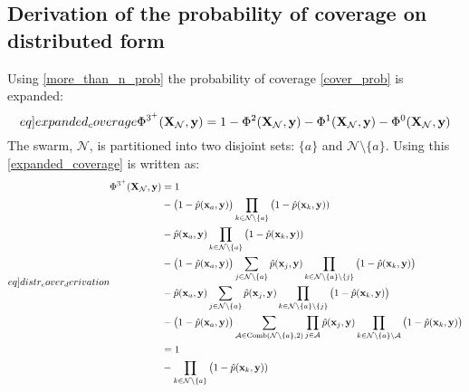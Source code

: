 \begin{appendices}
  \stoptocwriting
  \section{Derivation of the probability of coverage on distributed form}\label{appendix:derivations}

  Using \eqref{more_than_n_prob} the probability of coverage \eqref{cover_prob} is expanded:
  \begin{equation}\label[eq]{expanded_coverage}
    \Phi^{3^{+}}(\mathbf{X}_{\mathcal{N}}, \mathbf{y}) = 1 - \Phi^{2}(\mathbf{X}_{\mathcal{N}}, \mathbf{y}) - \Phi^{1}(\mathbf{X}_{\mathcal{N}}, \mathbf{y}) - \Phi^{0}(\mathbf{X}_{\mathcal{N}}, \mathbf{y})
  \end{equation}
  The swarm, $\mathcal{N}$, is partitioned into two disjoint sets: $\{a\}$ and $\mathcal{N}\setminus\{a\}$. 
  Using this \eqref{expanded_coverage} is written as:
  \begin{equation}\label[eq]{distr_cover_derivation}
    \begin{split}
      \Phi^{3^{+}}(\mathbf{X}_{\mathcal{N}}, \mathbf{y}) &= 1\\
      &- \big(1-\hat{p}(\mathbf{x}_{a}, \mathbf{y})\big)\prod_{k\in\mathcal{N}\setminus\{a\}}\big(1-\hat{p}(\mathbf{x}_{k}, \mathbf{y}))\\
      &- \hat{p}(\mathbf{x}_{a}, \mathbf{y})\prod_{k\in\mathcal{N}\setminus\{a\}}\big(1-\hat{p}(\mathbf{x}_{k}, \mathbf{y}))\\
      &- \big(1-\hat{p}(\mathbf{x}_{a}, \mathbf{y})\big)\sum_{j\in\mathcal{N}\setminus\{a\}}\hat{p}(\mathbf{x}_{j}, \mathbf{y})\prod_{k\in\mathcal{N}\setminus\{a\}\setminus\{j\}}\big(1-\hat{p}(\mathbf{x}_{k}, \mathbf{y})\big)\\
      &- \hat{p}(\mathbf{x}_{a}, \mathbf{y})\sum_{j\in \mathcal{N}\setminus\{a\}}\hat{p}(\mathbf{x}_{j}, \mathbf{y})\prod_{k\in\mathcal{N}\setminus\{a\}\setminus\{j\}}\big(1-\hat{p}(\mathbf{x}_{k}, \mathbf{y})\big)\\
      &- \big(1-\hat{p}(\mathbf{x}_{a}, \mathbf{y})\big)\sum_{\mathcal{A}\in \mathrm{Comb}(\mathcal{N}\setminus\{a\}, 2)}\prod_{j\in\mathcal{A}}\hat{p}(\mathbf{x}_{j}, \mathbf{y})\prod_{k\in\mathcal{N}\setminus\{a\}\setminus\mathcal{A}}\big(1-\hat{p}(\mathbf{x}_{k}, \mathbf{y})\big)\\
      &= 1\\
      &- \prod_{k\in\mathcal{N}\setminus\{a\}}\big(1-\hat{p}(\mathbf{x}_{k}, \mathbf{y}))\\

\end{split}
\end{equation}
\end{appendices}
